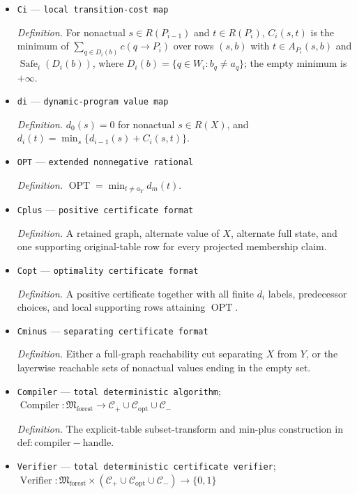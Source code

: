 \documentclass{article}
\begin{document}
\begin{itemize}
  \item \texttt{Ci} --- \texttt{local transition-\allowbreak{}cost map}
  \par\smallskip\noindent\emph{Definition.} For nonactual \(s\in R(P_{i-1})\) and \(t\in R(P_i)\), \(C_i(s,t)\) is the minimum of \(\sum_{q\in D_i(b)}c(q\to P_i)\) over rows \((s,b)\) with \(t\in A_{P_i}(s,b)\) and \(\operatorname{Safe}_i(D_i(b))\), where \(D_i(b)=\{q\in W_i:b_q\ne a_q\}\); the empty minimum is \(+\infty\).
  \item \texttt{di} --- \texttt{dynamic-\allowbreak{}program value map}
  \par\smallskip\noindent\emph{Definition.} \(d_0(s)=0\) for nonactual \(s\in R(X)\), and \(d_i(t)=\min_s\{d_{i-1}(s)+C_i(s,t)\}\).
  \item \texttt{OPT} --- \texttt{extended nonnegative rational}
  \par\smallskip\noindent\emph{Definition.} \(\operatorname{OPT}=\min_{t\ne a_Y}d_m(t)\).
  \item \texttt{Cplus} --- \texttt{positive certificate format}
  \par\smallskip\noindent\emph{Definition.} A retained graph, alternate value of \(X\), alternate full state, and one supporting original-table row for every projected membership claim.
  \item \texttt{Copt} --- \texttt{optimality certificate format}
  \par\smallskip\noindent\emph{Definition.} A positive certificate together with all finite \(d_i\) labels, predecessor choices, and local supporting rows attaining \(\operatorname{OPT}\).
  \item \texttt{Cminus} --- \texttt{separating certificate format}
  \par\smallskip\noindent\emph{Definition.} Either a full-graph reachability cut separating \(X\) from \(Y\), or the layerwise reachable sets of nonactual values ending in the empty set.
  \item \texttt{Compiler} --- \texttt{total deterministic algorithm}; \(\operatorname{Compiler}:\mathfrak M_{\mathrm{forest}}\to \mathcal C_{+}\cup\mathcal C_{\mathrm{opt}}\cup\mathcal C_{-}\)
  \par\smallskip\noindent\emph{Definition.} The explicit-table subset-transform and min-plus construction in \(\mathrm{def:compiler-handle}\).
  \item \texttt{Verifier} --- \texttt{total deterministic certificate verifier}; \(\operatorname{Verifier}:\mathfrak M_{\mathrm{forest}}\times(\mathcal C_{+}\cup\mathcal C_{\mathrm{opt}}\cup\mathcal C_{-})\to\{0,1\}\)

\end{itemize}
\end{document}
